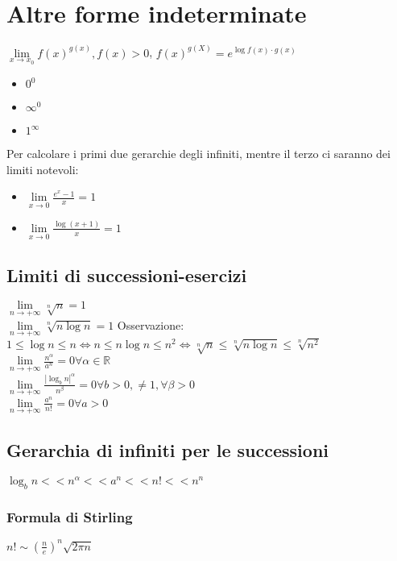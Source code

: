 \section{Altre forme indeterminate}
$\lim\limits_{x\rightarrow x_0} f(x)^{g(x)}, f(x)>0$, $f(x)^{g(X)}=e^{\log f(x)\cdot g(x)}$
\begin{itemize}
\item $0^0$
\item $\infty^0$
\item $1^\infty$
\end{itemize}
Per calcolare i primi due gerarchie degli infiniti, mentre il terzo ci saranno dei limiti notevoli:
\begin{itemize}
\item $\lim\limits_{x\rightarrow 0}\frac{e^x-1}{x}=1$
\item $\lim\limits_{x\rightarrow 0}\frac{\log (x+1)}{x}=1$
\end{itemize}
\subsection{Limiti di successioni-esercizi}
$\lim\limits_{n\rightarrow +\infty}\sqrt[n]{n}=1$\\
$\lim\limits_{n\rightarrow +\infty}\sqrt[n]{n\log n}=1$ Osservazione: $1\le\log n\le n\Leftrightarrow n\le n\log n\le n^2\Leftrightarrow \sqrt[n]{n}\le\sqrt[n]{n\log n} \le \sqrt[n]{n^2}$\\
$\lim\limits_{n\rightarrow +\infty}\frac{n^\alpha}{a^n}=0\forall\alpha\in\mathbb{R}$\\
$\lim\limits_{n\rightarrow +\infty}\frac{{|\log_b n|}^{\alpha}}{n^{\beta}}=0\forall b>0,\neq 1,\forall\beta>0$\\
$\lim\limits_{n\rightarrow +\infty}\frac{a^n}{n!}=0\forall a>0$
\subsection{Gerarchia di infiniti per le successioni}
$\log_b n <<n^\alpha<<a^n<<n!<<n^n$
\subsubsection{Formula di Stirling}
$n!\sim (\frac{n}{e})^n\sqrt{2\pi n}$
